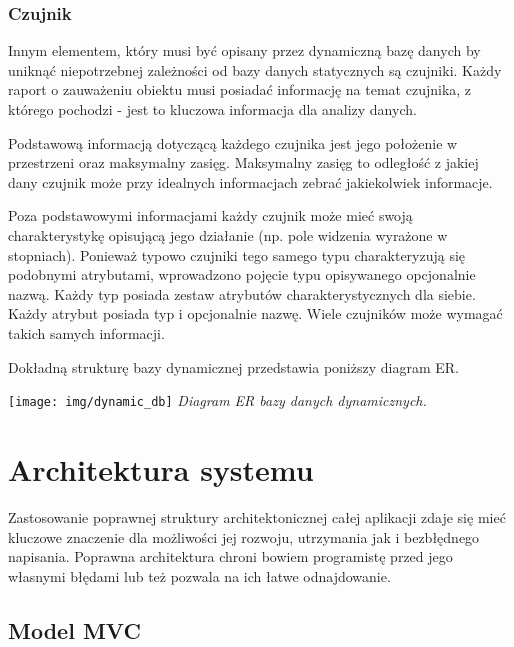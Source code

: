 \subsubsection{Czujnik}
\par{
Innym elementem, który musi być opisany przez dynamiczną bazę danych by uniknąć niepotrzebnej zależności od bazy danych statycznych są czujniki. Każdy raport o zauważeniu obiektu musi posiadać informację na temat czujnika, z którego pochodzi - jest to kluczowa informacja dla analizy danych.
}
\par{
Podstawową informacją dotyczącą każdego czujnika jest jego położenie w przestrzeni oraz maksymalny zasięg. Maksymalny zasięg to odległość z jakiej dany czujnik może przy idealnych informacjach zebrać jakiekolwiek informacje.
}
\par{
Poza podstawowymi informacjami każdy czujnik może mieć swoją charakterystykę opisującą jego działanie (np. pole widzenia wyrażone w stopniach). Ponieważ typowo czujniki tego samego typu charakteryzują się podobnymi atrybutami, wprowadzono pojęcie typu opisywanego opcjonalnie nazwą. Każdy typ posiada zestaw atrybutów charakterystycznych dla siebie. Każdy atrybut posiada typ i opcjonalnie nazwę. Wiele czujników może wymagać takich samych informacji.
}
\par{
Dokładną strukturę bazy dynamicznej przedstawia poniższy diagram ER.
}


\par{
\begin{center}
\texttt{[image: img/dynamic\_db]}
\textit{Diagram ER bazy danych dynamicznych.}
\end{center}
}


\section[Architektura systemu][Architektura systemu]{Architektura systemu}
\par{
Zastosowanie poprawnej struktury architektonicznej całej aplikacji zdaje się mieć kluczowe znaczenie dla możliwości jej rozwoju, utrzymania jak i bezbłędnego napisania. Poprawna architektura chroni bowiem programistę przed jego własnymi błędami lub też pozwala na ich łatwe odnajdowanie.
}
\subsection{Model MVC}
